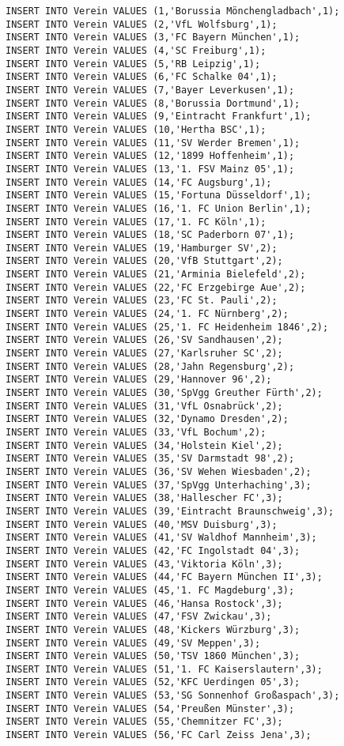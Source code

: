\documentclass{bschlangaul-aufgabe}
\begin{document}
\begin{verbatim}
INSERT INTO Verein VALUES (1,'Borussia Mönchengladbach',1);
INSERT INTO Verein VALUES (2,'VfL Wolfsburg',1);
INSERT INTO Verein VALUES (3,'FC Bayern München',1);
INSERT INTO Verein VALUES (4,'SC Freiburg',1);
INSERT INTO Verein VALUES (5,'RB Leipzig',1);
INSERT INTO Verein VALUES (6,'FC Schalke 04',1);
INSERT INTO Verein VALUES (7,'Bayer Leverkusen',1);
INSERT INTO Verein VALUES (8,'Borussia Dortmund',1);
INSERT INTO Verein VALUES (9,'Eintracht Frankfurt',1);
INSERT INTO Verein VALUES (10,'Hertha BSC',1);
INSERT INTO Verein VALUES (11,'SV Werder Bremen',1);
INSERT INTO Verein VALUES (12,'1899 Hoffenheim',1);
INSERT INTO Verein VALUES (13,'1. FSV Mainz 05',1);
INSERT INTO Verein VALUES (14,'FC Augsburg',1);
INSERT INTO Verein VALUES (15,'Fortuna Düsseldorf',1);
INSERT INTO Verein VALUES (16,'1. FC Union Berlin',1);
INSERT INTO Verein VALUES (17,'1. FC Köln',1);
INSERT INTO Verein VALUES (18,'SC Paderborn 07',1);
INSERT INTO Verein VALUES (19,'Hamburger SV',2);
INSERT INTO Verein VALUES (20,'VfB Stuttgart',2);
INSERT INTO Verein VALUES (21,'Arminia Bielefeld',2);
INSERT INTO Verein VALUES (22,'FC Erzgebirge Aue',2);
INSERT INTO Verein VALUES (23,'FC St. Pauli',2);
INSERT INTO Verein VALUES (24,'1. FC Nürnberg',2);
INSERT INTO Verein VALUES (25,'1. FC Heidenheim 1846',2);
INSERT INTO Verein VALUES (26,'SV Sandhausen',2);
INSERT INTO Verein VALUES (27,'Karlsruher SC',2);
INSERT INTO Verein VALUES (28,'Jahn Regensburg',2);
INSERT INTO Verein VALUES (29,'Hannover 96',2);
INSERT INTO Verein VALUES (30,'SpVgg Greuther Fürth',2);
INSERT INTO Verein VALUES (31,'VfL Osnabrück',2);
INSERT INTO Verein VALUES (32,'Dynamo Dresden',2);
INSERT INTO Verein VALUES (33,'VfL Bochum',2);
INSERT INTO Verein VALUES (34,'Holstein Kiel',2);
INSERT INTO Verein VALUES (35,'SV Darmstadt 98',2);
INSERT INTO Verein VALUES (36,'SV Wehen Wiesbaden',2);
INSERT INTO Verein VALUES (37,'SpVgg Unterhaching',3);
INSERT INTO Verein VALUES (38,'Hallescher FC',3);
INSERT INTO Verein VALUES (39,'Eintracht Braunschweig',3);
INSERT INTO Verein VALUES (40,'MSV Duisburg',3);
INSERT INTO Verein VALUES (41,'SV Waldhof Mannheim',3);
INSERT INTO Verein VALUES (42,'FC Ingolstadt 04',3);
INSERT INTO Verein VALUES (43,'Viktoria Köln',3);
INSERT INTO Verein VALUES (44,'FC Bayern München II',3);
INSERT INTO Verein VALUES (45,'1. FC Magdeburg',3);
INSERT INTO Verein VALUES (46,'Hansa Rostock',3);
INSERT INTO Verein VALUES (47,'FSV Zwickau',3);
INSERT INTO Verein VALUES (48,'Kickers Würzburg',3);
INSERT INTO Verein VALUES (49,'SV Meppen',3);
INSERT INTO Verein VALUES (50,'TSV 1860 München',3);
INSERT INTO Verein VALUES (51,'1. FC Kaiserslautern',3);
INSERT INTO Verein VALUES (52,'KFC Uerdingen 05',3);
INSERT INTO Verein VALUES (53,'SG Sonnenhof Großaspach',3);
INSERT INTO Verein VALUES (54,'Preußen Münster',3);
INSERT INTO Verein VALUES (55,'Chemnitzer FC',3);
INSERT INTO Verein VALUES (56,'FC Carl Zeiss Jena',3);


\end{verbatim}
\end{document}
